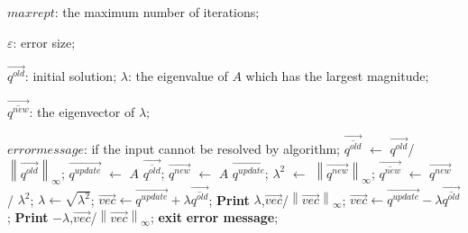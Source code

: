 \documentclass[12pt,a4paper,UTF8]{ctexart}
\begin{document}
\begin{enumerate}
\begin{algorithm}[H]
\begin{algorithmic}[1]
                  $maxrept$: the maximum number of iterations;

                  $\varepsilon $: error size;

                  $\overrightarrow{q^{old}} $: initial solution;
                  \Ensure
                  $\lambda$: the eigenvalue of $A$ which has the largest magnitude;

                  $\overrightarrow{\overline{q^{new}} }$: the eigenvector of $\lambda$;

                  $error message$: if the input cannot be resolved by algorithm;
                  \State $\overrightarrow{\overline{q^{old}}}$ $\leftarrow$ ${\overrightarrow{q^{old}}}$/${\left\lVert \overrightarrow{q^{old}}\right\rVert_{\infty} }$;
                  \State$\overrightarrow{q^{update}} $ $\leftarrow$ $A$ $\overrightarrow{\overline{q^{old}}}$;
                  \State$\overrightarrow{q^{new}}$ $\leftarrow$ $A$ $\overrightarrow{q^{update}}$;
                  \State$\lambda^{2}$ $\leftarrow$ ${\left\lVert \overrightarrow{q^{new}}\right\rVert_{\infty} }$;
                  \State$\overrightarrow{\overline{q^{new}} }$ $\leftarrow$ $\overrightarrow{q^{new}}$ / $\lambda^{2}$;
                  \State$\lambda$$\leftarrow$$\sqrt{\lambda^{2}}$;
                          \State$\overrightarrow{vec}$$\leftarrow$$\overrightarrow{q^{update} }+\lambda \overrightarrow{\overline{q^{old}} }$;
                          \State\textbf{Print} $\lambda$,${\overrightarrow{vec}}$/${\left\lVert \overrightarrow{vec}\right\rVert_{\infty} }$;
                          \EndIf
                          \State$\overrightarrow{vec}$$\leftarrow$$\overrightarrow{q^{update} }-\lambda \overrightarrow{\overline{q^{old}} }$;
                          \State\textbf{Print} $-\lambda$,${\overrightarrow{vec}}$/${\left\lVert \overrightarrow{vec}\right\rVert_{\infty} }$;
                  \EndIf
                  \State\textbf{exit}
                  \EndIf
                  \EndFor
                  \State \textbf{error message};
              \end{algorithmic}
          \end{algorithm}

\end{enumerate}
\end{document}
